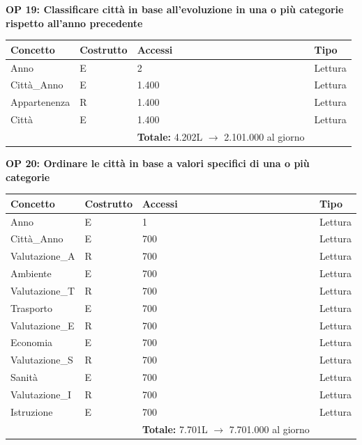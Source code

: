 \documentclass[a4paper,12pt]{report}
\begin{document}
            \noindent
            \textbf{OP 19: Classificare città in base all’evoluzione in una o più categorie rispetto all’anno precedente}
        	\begin{table}[H]
            \centering
             \begin{tabular}{llll}
             \rowcolor{yellow!20} \textbf{Concetto} & \textbf{Costrutto} & \textbf{Accessi} & \textbf{Tipo}\\ [0.5ex] 
             \hline
             Anno & E & 2 & Lettura \\ 
             Città\_Anno & E & 1.400 & Lettura \\ 
             Appartenenza & R & 1.400 & Lettura \\ 
             Città & E & 1.400 & Lettura \\ 
             \hline
                \rowcolor{yellow!20} &   & \textbf{Totale:} 4.202L $\rightarrow$ 2.101.000 al giorno &  \\ [1ex] 
             
             \end{tabular}
            \end{table}

            \newpage
            \noindent
            \textbf{OP 20: Ordinare le città in base a valori specifici di una o più categorie}
        	\begin{table}[H]
            \centering
             \begin{tabular}{llll}
             \rowcolor{yellow!20} \textbf{Concetto} & \textbf{Costrutto} & \textbf{Accessi} & \textbf{Tipo}\\ [0.5ex] 
             \hline
             Anno & E & 1 & Lettura \\ 
             Città\_Anno & E & 700 & Lettura \\ 
             Valutazione\_A & R & 700 & Lettura \\ 
             Ambiente & E & 700 & Lettura \\
             Valutazione\_T & R & 700 & Lettura \\ 
             Trasporto & E & 700 & Lettura \\
             Valutazione\_E & R & 700 & Lettura \\ 
             Economia & E & 700 & Lettura \\
             Valutazione\_S & R & 700 & Lettura \\ 
             Sanità & E & 700 & Lettura \\
             Valutazione\_I & R & 700 & Lettura \\ 
             Istruzione & E & 700 & Lettura \\
             \hline
                \rowcolor{yellow!20} &   & \textbf{Totale:} 7.701L $\rightarrow$ 7.701.000 al giorno &  \\ [1ex] 
             
             \end{tabular}
            \end{table}
\end{document}
